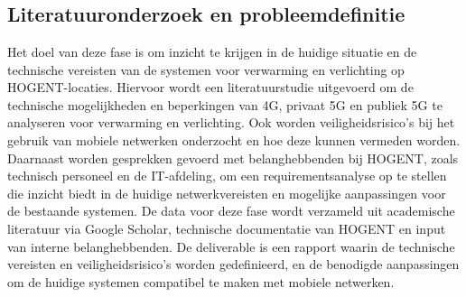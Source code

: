 
\chapter{}%
\label{ch:methodologie}


\section{Literatuuronderzoek en probleemdefinitie}
Het doel van deze fase is om inzicht te krijgen in de huidige situatie en de technische vereisten van de systemen voor verwarming en verlichting op HOGENT-locaties. Hiervoor wordt een literatuurstudie uitgevoerd om de technische mogelijkheden en beperkingen van 4G, privaat 5G en publiek 5G te analyseren voor verwarming en verlichting. Ook worden veiligheidsrisico's bij het gebruik van mobiele netwerken onderzocht en hoe deze kunnen vermeden worden. Daarnaast worden gesprekken gevoerd met belanghebbenden bij HOGENT, zoals technisch personeel en de IT-afdeling, om een requirementsanalyse op te stellen die inzicht biedt in de huidige netwerkvereisten en mogelijke aanpassingen voor de bestaande systemen. De data voor deze fase wordt verzameld uit academische literatuur via Google Scholar, technische documentatie van HOGENT en input van interne belanghebbenden. De deliverable is een rapport waarin de technische vereisten en veiligheidsrisico’s worden gedefinieerd, en de benodigde aanpassingen om de huidige systemen compatibel te maken met mobiele netwerken.


